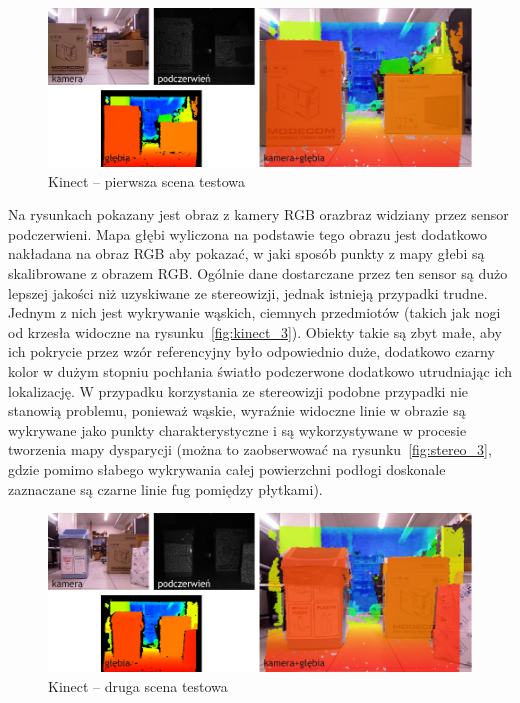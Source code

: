 \begin{figure}[h!]
\centering
\includegraphics{../img/kinect_1}
\caption[Kinect -- pierwsza scena testowa]{Kinect -- pierwsza scena testowa}
\label{fig:kinect_1}
\end{figure}

Na rysunkach pokazany jest obraz z kamery RGB orazbraz widziany przez sensor
podczerwieni. Mapa głębi wyliczona na podstawie tego obrazu jest dodatkowo nakładana
na obraz RGB aby pokazać, w jaki sposób punkty z mapy głebi są skalibrowane z obrazem RGB.
Ogólnie dane dostarczane przez ten sensor są dużo lepszej jakości niż uzyskiwane
ze stereowizji, jednak istnieją przypadki trudne. Jednym z nich jest wykrywanie
wąskich, ciemnych przedmiotów (takich jak nogi od krzesła widoczne na
rysunku~\ref{fig:kinect_3}). Obiekty takie są zbyt małe, aby ich pokrycie przez
wzór referencyjny było odpowiednio duże, dodatkowo czarny kolor w dużym stopniu
pochłania światło podczerwone dodatkowo utrudniając ich lokalizację. W przypadku
korzystania ze stereowizji podobne przypadki nie stanowią problemu, ponieważ
wąskie, wyraźnie widoczne linie w obrazie są wykrywane jako punkty charakterystyczne
i są wykorzystywane w procesie tworzenia mapy dysparycji (można to zaobserwować
na rysunku~\ref{fig:stereo_3}, gdzie pomimo słabego wykrywania całej powierzchni
podłogi doskonale zaznaczane są czarne linie fug pomiędzy płytkami).

\begin{figure}[h!]
\centering
\includegraphics{../img/kinect_2}
\caption[Kinect -- druga scena testowa]{Kinect -- druga scena testowa}
\label{fig:kinect_2}
\end{figure}

